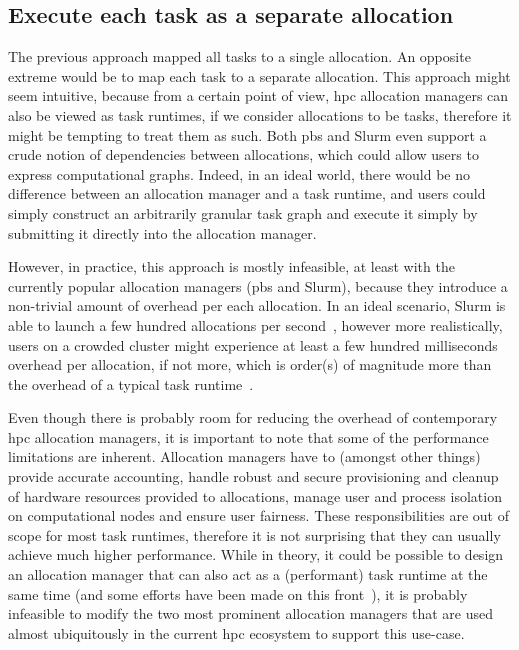 \subsection*{Execute each task as a separate allocation}
The previous approach mapped all tasks to a single allocation. An opposite extreme would be to map
each task to a separate allocation. This approach might seem intuitive, because from a certain
point of view, \gls{hpc} allocation managers can also be viewed as task runtimes,
if we consider allocations to be tasks, therefore it might be tempting to treat them as such. Both
\gls{pbs} and Slurm even support a crude notion of dependencies between
allocations, which could allow users to express computational graphs. Indeed, in an ideal world,
there would be no difference between an allocation manager and a task runtime, and users could
simply construct an arbitrarily granular task graph and execute it simply by submitting it directly
into the allocation manager.

However, in practice, this approach is mostly infeasible, at least with the currently popular
allocation managers (\gls{pbs} and Slurm), because they introduce a non-trivial
amount of overhead per each allocation. In an ideal scenario, Slurm is able to launch a few hundred
allocations per second~\cite{slurm-throughput}, however more realistically, users on a crowded
cluster might experience at least a few hundred milliseconds overhead per allocation, if not more,
which is order(s) of magnitude more than the overhead of a typical task
runtime~\cite{rsds}.

Even though there is probably room for reducing the overhead of contemporary
\gls{hpc} allocation managers, it is important to note that some of the
performance limitations are inherent. Allocation managers have to (amongst other things) provide
accurate accounting, handle robust and secure provisioning and cleanup of hardware resources
provided to allocations, manage user and process isolation on computational nodes and ensure user
fairness. These responsibilities are out of scope for most task runtimes, therefore it is not
surprising that they can usually achieve much higher performance. While in theory, it could be
possible to design an allocation manager that can also act as a (performant) task runtime at the
same time (and some efforts have been made on this front~\cite{flux}), it is
probably infeasible to modify the two most prominent allocation managers that are used almost
ubiquitously in the current \gls{hpc} ecosystem to support this use-case.

